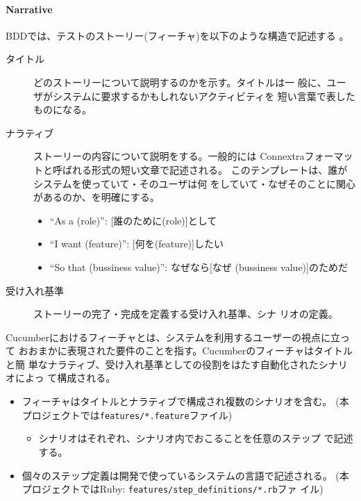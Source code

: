    \paragraph{Narrative}
BDDでは、テストのストーリー(フィーチャ)を以下のような構造で記述する
\cite{rspec-book,spiral-workflow}。
\begin{description}
 \item[タイトル] どのストーリーについて説明するのかを示す。タイトルは一
            般に、ユーザがシステムに要求するかもしれないアクティビティを
            短い言葉で表したものになる。
 \item[ナラティブ] ストーリーの内容について説明をする。一般的には
            Connextraフォーマットと呼ばれる形式の短い文章で記述される。
            このテンプレートは、誰がシステムを使っていて・そのユーザは何
            をしていて・なぜそのことに関心があるのか、を明確にする。
            \begin{itemize}
             \item ``As a (role)'': [誰のために(role)]として
             \item ``I want (feature)'': [何を(feature)]したい
             \item ``So that (bussiness value)'': なぜなら[なぜ
                   (bussiness value)]のためだ
            \end{itemize}
 \item[受け入れ基準] ストーリーの完了・完成を定義する受け入れ基準、シナ
            リオの定義。
\end{description}

Cucumberにおけるフィーチャとは、システムを利用するユーザーの視点に立って
おおまかに表現された要件のことを指す。Cucumberのフィーチャはタイトルと簡
単なナラティブ、受け入れ基準としての役割をはたす自動化されたシナリオによっ
て構成される。
\begin{itemize}
 \item フィーチャはタイトルとナラティブで構成され複数のシナリオを含む。
       (本プロジェクトでは\verb|features/*.feature|ファイル)
       \begin{itemize}
        \item シナリオはそれぞれ、シナリオ内でおこることを任意のステップ
              で記述する。
       \end{itemize}
 \item 個々のステップ定義は開発で使っているシステムの言語で記述される。
       (本プロジェクトではRuby: \verb|features/step_definitions/*.rb|ファ
       イル)
\end{itemize}

